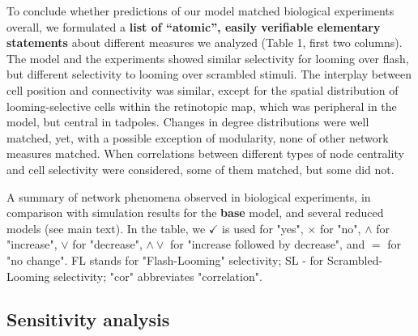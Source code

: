\documentclass{article}
\begin{document}
To conclude whether predictions of our model matched biological experiments overall, we formulated a \textbf{list of “atomic”, easily verifiable elementary statements} about different measures we analyzed (Table 1, first two columns). The model and the experiments showed similar selectivity for looming over flash, but different selectivity to looming over scrambled stimuli. The interplay between cell position and connectivity was similar, except for the spatial distribution of looming-selective cells within the retinotopic map, which was peripheral in the model, but central in tadpoles. Changes in degree distributions were well matched, yet, with a possible exception of modularity, none of other network measures matched. When correlations between different types of node centrality and cell selectivity were considered, some of them matched, but some did not.

\begin{table}
    
    \caption{A summary of network phenomena observed in biological experiments, in comparison with simulation results for the \textbf{base} model, and several reduced models (see main text). In the table, we $\checkmark$ is used for "yes", $\times$ for "no", $\land$ for "increase", $\lor$ for "decrease", $\land \lor$ for "increase followed by decrease", and $=$ for "no change". FL stands for "Flash-Looming" selectivity; SL - for Scrambled-Looming selectivity; "cor" abbreviates "correlation".}
\end{table}

\subsection*{Sensitivity analysis}
\end{document}

